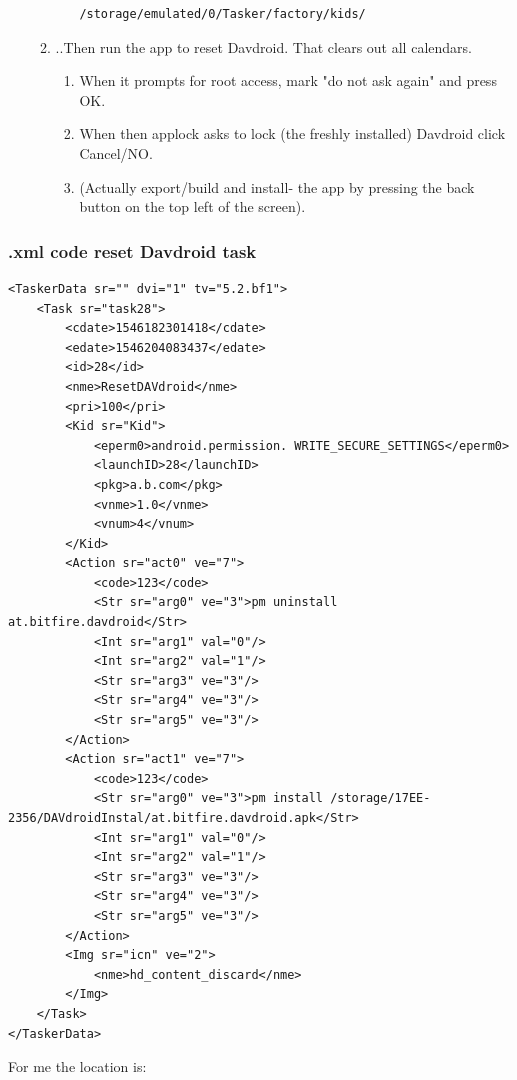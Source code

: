 \begin{enumerate}
\begin{enumerate}
\begin{itemize}
\begin{verbatim}
/storage/emulated/0/Tasker/factory/kids/
\end{verbatim}       
        \end{itemize}
        \item ..Then run the app to reset Davdroid. That clears out all calendars. 
            \begin{enumerate}
                \item When it prompts for root access, mark "do not ask again" and press OK.
                \item When then applock asks to lock (the freshly installed) Davdroid click Cancel/NO.
                \item (Actually export/build and install- the app by pressing the back button on the top left of the screen).
            \end{enumerate}
    \end{enumerate}
\end{enumerate}
\subsubsection{.xml code reset Davdroid task}\label{subsubsec:taskResetDavdroid}
\begin{verbatim}
<TaskerData sr="" dvi="1" tv="5.2.bf1">
    <Task sr="task28">
        <cdate>1546182301418</cdate>
        <edate>1546204083437</edate>
        <id>28</id>
        <nme>ResetDAVdroid</nme>
        <pri>100</pri>
        <Kid sr="Kid">
            <eperm0>android.permission. WRITE_SECURE_SETTINGS</eperm0>
            <launchID>28</launchID>
            <pkg>a.b.com</pkg>
            <vnme>1.0</vnme>
            <vnum>4</vnum>
        </Kid>
        <Action sr="act0" ve="7">
            <code>123</code>
            <Str sr="arg0" ve="3">pm uninstall at.bitfire.davdroid</Str>
            <Int sr="arg1" val="0"/>
            <Int sr="arg2" val="1"/>
            <Str sr="arg3" ve="3"/>
            <Str sr="arg4" ve="3"/>
            <Str sr="arg5" ve="3"/>
        </Action>
        <Action sr="act1" ve="7">
            <code>123</code>
            <Str sr="arg0" ve="3">pm install /storage/17EE-2356/DAVdroidInstal/at.bitfire.davdroid.apk</Str>
            <Int sr="arg1" val="0"/>
            <Int sr="arg2" val="1"/>
            <Str sr="arg3" ve="3"/>
            <Str sr="arg4" ve="3"/>
            <Str sr="arg5" ve="3"/>
        </Action>
        <Img sr="icn" ve="2">
            <nme>hd_content_discard</nme>
        </Img>
    </Task>
</TaskerData>
\end{verbatim}
For me the location is: %


